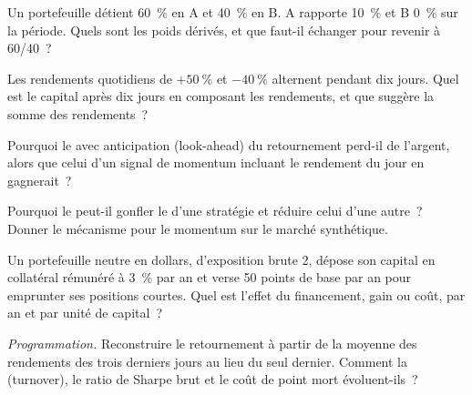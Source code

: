 \begin{exercise}[$\star$]\label{exo:rs:vectorised-backtests:2}
Un portefeuille détient 60~\% en A et 40~\% en B. A rapporte 10~\% et B 0~\% sur la période. Quels sont les poids dérivés, et que faut-il échanger pour revenir à
60/40~?
\end{exercise}

\begin{exercise}[$\star$]\label{exo:rs:vectorised-backtests:3}
Les rendements quotidiens de $+50~\%$ et $-40~\%$ alternent pendant dix jours. Quel est le capital après dix jours en composant les rendements, et que suggère la somme des rendements~?
\end{exercise}

\begin{exercise}[$\star\star$]\label{exo:rs:vectorised-backtests:4}
Pourquoi le  avec anticipation (look-ahead) du retournement perd-il de l'argent, alors que celui d'un signal de momentum incluant le rendement du jour en gagnerait~?
\end{exercise}

\begin{exercise}[$\star\star$]\label{exo:rs:vectorised-backtests:5}
Pourquoi le  peut-il gonfler le  d'une stratégie et réduire celui d'une autre~? Donner le mécanisme pour le momentum sur le marché synthétique.
\end{exercise}

\begin{exercise}[$\star\star$]\label{exo:rs:vectorised-backtests:6}
Un portefeuille neutre en dollars, d'exposition brute 2, dépose son capital en collatéral rémunéré à 3~\% par an et verse 50 points de base par an pour emprunter ses positions courtes. Quel
est l'effet du financement, gain ou coût, par an et par unité de capital~?
\end{exercise}

\begin{exercise}[$\star\star\star$]\label{exo:rs:vectorised-backtests:7}
\emph{Programmation.} Reconstruire le retournement à partir de la moyenne des rendements des trois derniers jours au lieu du seul dernier. Comment la  (turnover), le ratio de Sharpe brut et
le coût de point mort évoluent-ils~?
\end{exercise}

